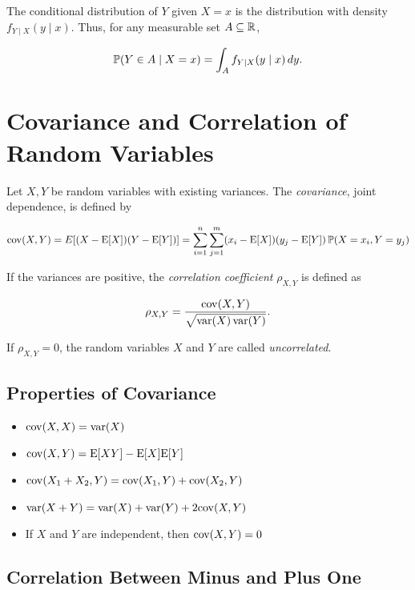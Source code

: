 The conditional distribution of \(Y\) given \(X = x\) is the distribution with density \(f_{Y\mid X}(y\mid x)\).
Thus, for any measurable set \(A \subseteq \mathbb{R}\),

\[
    \mathbb{P}(Y \in A \mid X = x) = \int_A f_{Y\mid X}(y\mid x)\, dy.
\]

\section{Covariance and Correlation of Random Variables}

Let \(X, Y\) be random variables with existing variances. The \emph{covariance}, joint dependence, is defined by

\[
    \mathrm{cov}(X, Y) = E[(X - \mathrm{E}[X])(Y - \mathrm{E}[Y])] = \sum_{i = 1}^{n} \sum_{j = 1}^{m} (x_i - \mathrm{E}[X])(y_j - \mathrm{E}[Y]) \, \mathbb{P}(X = x_i, Y = y_j)
\]

If the variances are positive, the \emph{correlation coefficient} \(\rho_{X,Y}\) is defined as

\[
    \rho_{X,Y}
    = \frac{\mathrm{cov}(X,Y)}{\sqrt{\mathrm{var}(X)\,\mathrm{var}(Y)}}.
\]

If \(\rho_{X,Y} = 0\), the random variables \(X\) and \(Y\) are called \emph{uncorrelated}.


\subsection{Properties of Covariance}

\begin{itemize}

    \item \(\mathrm{cov}(X, X) = \mathrm{var}(X)\)

    \item \(\mathrm{cov}(X, Y) = \mathrm{E}[XY] - \mathrm{E}[X]\mathrm{E}[Y]\)

    \item \(\mathrm{cov}(X_1 + X_2, Y) = \mathrm{cov}(X_1, Y) + \mathrm{cov}(X_2, Y)\)

    \item \(\mathrm{var}(X + Y) = \mathrm{var}(X) + \mathrm{var}(Y) + 2\mathrm{cov}(X, Y)\)

    \item If \(X\) and \(Y\) are independent, then \(\mathrm{cov}(X, Y) = 0\)

\end{itemize}

\subsection{Correlation Between Minus and Plus One}

